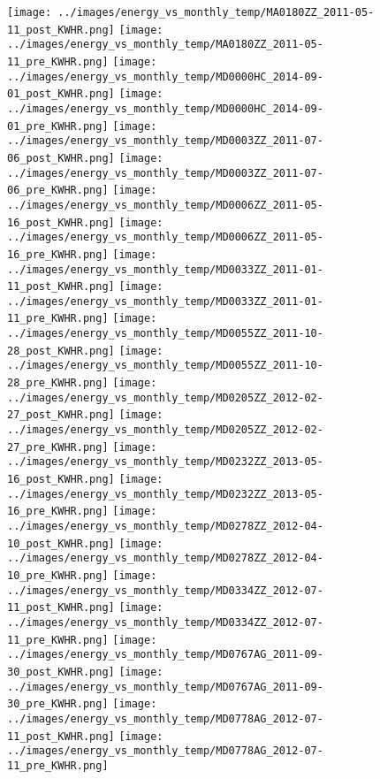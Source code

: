 \clearpage
\begin{figure}
\centering
\texttt{[image: ../images/energy\_vs\_monthly\_temp/MA0180ZZ\_2011-05-11\_post\_KWHR.png]}
\texttt{[image: ../images/energy\_vs\_monthly\_temp/MA0180ZZ\_2011-05-11\_pre\_KWHR.png]}
\texttt{[image: ../images/energy\_vs\_monthly\_temp/MD0000HC\_2014-09-01\_post\_KWHR.png]}
\texttt{[image: ../images/energy\_vs\_monthly\_temp/MD0000HC\_2014-09-01\_pre\_KWHR.png]}
\texttt{[image: ../images/energy\_vs\_monthly\_temp/MD0003ZZ\_2011-07-06\_post\_KWHR.png]}
\texttt{[image: ../images/energy\_vs\_monthly\_temp/MD0003ZZ\_2011-07-06\_pre\_KWHR.png]}
\texttt{[image: ../images/energy\_vs\_monthly\_temp/MD0006ZZ\_2011-05-16\_post\_KWHR.png]}
\texttt{[image: ../images/energy\_vs\_monthly\_temp/MD0006ZZ\_2011-05-16\_pre\_KWHR.png]}
\texttt{[image: ../images/energy\_vs\_monthly\_temp/MD0033ZZ\_2011-01-11\_post\_KWHR.png]}
\texttt{[image: ../images/energy\_vs\_monthly\_temp/MD0033ZZ\_2011-01-11\_pre\_KWHR.png]}
\texttt{[image: ../images/energy\_vs\_monthly\_temp/MD0055ZZ\_2011-10-28\_post\_KWHR.png]}
\texttt{[image: ../images/energy\_vs\_monthly\_temp/MD0055ZZ\_2011-10-28\_pre\_KWHR.png]}
\texttt{[image: ../images/energy\_vs\_monthly\_temp/MD0205ZZ\_2012-02-27\_post\_KWHR.png]}
\texttt{[image: ../images/energy\_vs\_monthly\_temp/MD0205ZZ\_2012-02-27\_pre\_KWHR.png]}
\texttt{[image: ../images/energy\_vs\_monthly\_temp/MD0232ZZ\_2013-05-16\_post\_KWHR.png]}
\texttt{[image: ../images/energy\_vs\_monthly\_temp/MD0232ZZ\_2013-05-16\_pre\_KWHR.png]}
\texttt{[image: ../images/energy\_vs\_monthly\_temp/MD0278ZZ\_2012-04-10\_post\_KWHR.png]}
\texttt{[image: ../images/energy\_vs\_monthly\_temp/MD0278ZZ\_2012-04-10\_pre\_KWHR.png]}
\texttt{[image: ../images/energy\_vs\_monthly\_temp/MD0334ZZ\_2012-07-11\_post\_KWHR.png]}
\texttt{[image: ../images/energy\_vs\_monthly\_temp/MD0334ZZ\_2012-07-11\_pre\_KWHR.png]}
\texttt{[image: ../images/energy\_vs\_monthly\_temp/MD0767AG\_2011-09-30\_post\_KWHR.png]}
\texttt{[image: ../images/energy\_vs\_monthly\_temp/MD0767AG\_2011-09-30\_pre\_KWHR.png]}
\texttt{[image: ../images/energy\_vs\_monthly\_temp/MD0778AG\_2012-07-11\_post\_KWHR.png]}
\texttt{[image: ../images/energy\_vs\_monthly\_temp/MD0778AG\_2012-07-11\_pre\_KWHR.png]}
\end{figure}
